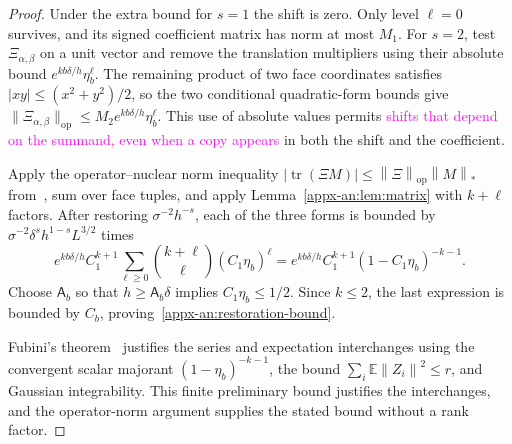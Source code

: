 \documentclass[11pt,letterpaper]{article}
\theoremstyle{remark}
\newcommand{\E}{\mathbb E}
\newcommand{\tr}{\operatorname{tr}}
\newcommand{\op}{\mathrm{op}}
\newcommand{\norm}[1]{\left\lVert#1\right\rVert}
\begin{document}
\begin{proof}
Under the extra bound for $s=1$ the shift is zero. Only level $\ell=0$ survives, and its signed coefficient matrix has norm at most $M_1$. For $s=2$, test $\Xi_{\alpha,\beta}$ on a unit vector and remove the translation multipliers using their absolute bound $e^{kb\delta/h}\eta_b^\ell$. The remaining product of two face coordinates satisfies $|xy|\le(x^2+y^2)/2$, so the two conditional quadratic-form bounds give $\|\Xi_{\alpha,\beta}\|_{\op}\le M_2 e^{kb\delta/h}\eta_b^\ell$. This use of absolute values permits \textcolor{magenta}{shifts that depend on the summand, even when a copy appears} in both the shift and the coefficient.

Apply the operator--nuclear norm inequality
\(|\tr(\Xi M)|\le\norm\Xi_\op\norm M_*\)
from~\cite[Chapter~IV]{Bhatia1997}, sum over face
tuples, and apply Lemma~\ref{appx-an:lem:matrix} with \(k+\ell\) factors.
After restoring \(\sigma^{-2}h^{-s}\), each of the three forms
is bounded by \(\sigma^{-2}\delta^sh^{1-s}L^{3/2}\) times
\[
 e^{kb\delta/h}C_1^{k+1}
 \sum_{\ell\ge0}\binom{k+\ell}{\ell}(C_1\eta_b)^\ell
 =e^{kb\delta/h}C_1^{k+1}(1-C_1\eta_b)^{-k-1}.
\]
Choose \(\mathsf A_b\) so that \(h\ge\mathsf A_b\delta\) implies
\(C_1\eta_b\le1/2\). Since \(k\le2\), the last expression is
bounded by \(C_b\), proving~\eqref{appx-an:restoration-bound}.

Fubini's theorem~\cite[Section~2.5]{Folland1999} justifies the
series and expectation interchanges using the convergent scalar
majorant \((1-\eta_b)^{-k-1}\), the bound
\(\sum_i\E\norm{Z_i}^2\le r\), and Gaussian integrability.
This finite preliminary bound justifies the interchanges, and the
operator-norm argument supplies the stated bound without a rank factor.
\end{proof}
\end{document}
